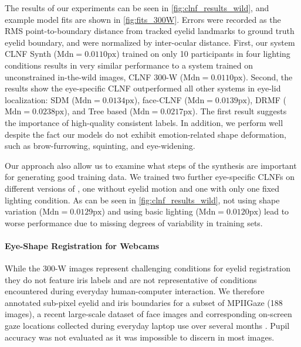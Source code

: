 The results of our experiments can be seen in \autoref{fig:clnf_results_wild}, and example model fits are shown in \autoref{fig:fits_300W}.
Errors were recorded as the RMS point-to-boundary distance from tracked eyelid landmarks to ground truth eyelid boundary, and were normalized by inter-ocular distance. 
%
First, our system CLNF Synth ($\textrm{Mdn}=0.0110\textrm{px}$) trained on only 10 participants in four lighting conditions results in very similar performance to a system trained on unconstrained in-the-wild images, CLNF 300-W ($\textrm{Mdn}=0.0110\textrm{px}$).
%
Second, the results show the eye-specific CLNF outperformed all other systems in eye-lid localization: SDM ($\textrm{Mdn}=0.0134\textrm{px}$), face-CLNF ($\textrm{Mdn}=0.0139\textrm{px}$), DRMF ($\textrm{Mdn}=0.0238\textrm{px}$), and Tree based ($\textrm{Mdn}=0.0217\textrm{px}$). 
The first result suggests the importance of high-quality consistent labels. In addition, we perform well despite the fact our models do not exhibit emotion-related shape deformation, such as brow-furrowing, squinting, and eye-widening.

Our approach also allow us to examine what steps of the synthesis are important for generating good training data. We trained two further eye-specific CLNFs on different versions of \dataset, one without eyelid motion and one with only one fixed lighting condition. As can be seen in \autoref{fig:clnf_results_wild}, not using shape variation ($\textrm{Mdn}=0.0129\textrm{px}$) and using basic lighting ($\textrm{Mdn}=0.0120\textrm{px}$) lead to worse performance due to missing degrees of variability in training sets.

\paragraph{Eye-Shape Registration for Webcams}




While the 300-W images represent challenging conditions for eyelid registration they do not feature iris labels and are not representative of conditions encountered during everyday human-computer interaction.
We therefore annotated sub-pixel eyelid and iris boundaries for a subset of MPIIGaze \cite{zhang15_cvpr} (188 images), a recent large-scale dataset of face images and corresponding on-screen gaze locations collected during everyday laptop use over several months \cite{zhang15_cvpr}.
Pupil accuracy was not evaluated as it was impossible to discern in most images.

